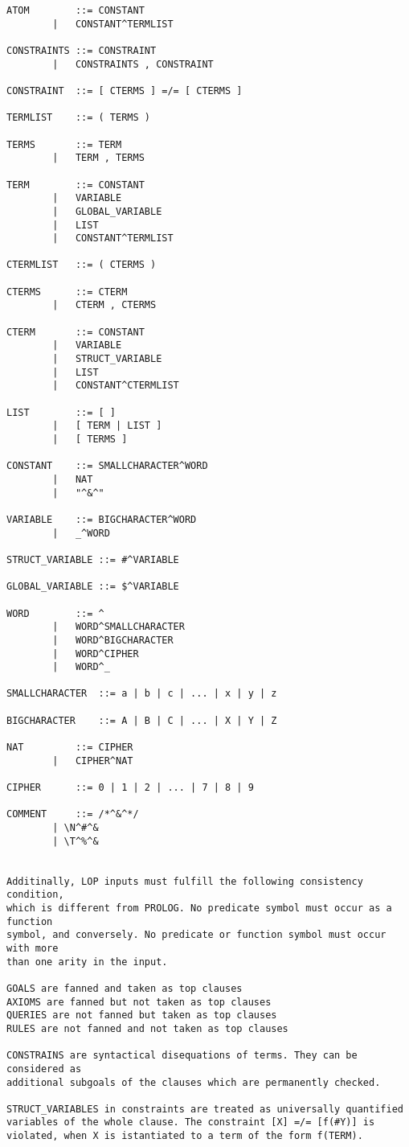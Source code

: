 \begin{verbatim}
ATOM 		::= CONSTANT 
		|   CONSTANT^TERMLIST

CONSTRAINTS	::= CONSTRAINT
		|   CONSTRAINTS , CONSTRAINT

CONSTRAINT	::= [ CTERMS ] =/= [ CTERMS ]

TERMLIST	::= ( TERMS )

TERMS	 	::= TERM
		|   TERM , TERMS

TERM		::= CONSTANT
		|   VARIABLE
		|   GLOBAL_VARIABLE
		|   LIST
		|   CONSTANT^TERMLIST

CTERMLIST	::= ( CTERMS )

CTERMS	 	::= CTERM
		|   CTERM , CTERMS

CTERM		::= CONSTANT
		|   VARIABLE
		|   STRUCT_VARIABLE
		|   LIST
		|   CONSTANT^CTERMLIST

LIST		::= [ ]
		|   [ TERM | LIST ]
		|   [ TERMS ]

CONSTANT	::= SMALLCHARACTER^WORD
		|   NAT
		|   "^&^"

VARIABLE	::= BIGCHARACTER^WORD
		|   _^WORD

STRUCT_VARIABLE	::= #^VARIABLE

GLOBAL_VARIABLE ::= $^VARIABLE

WORD		::= ^
		|   WORD^SMALLCHARACTER
		|   WORD^BIGCHARACTER
		|   WORD^CIPHER
		|   WORD^_

SMALLCHARACTER	::= a | b | c | ... | x | y | z

BIGCHARACTER	::= A | B | C | ... | X | Y | Z 

NAT 		::= CIPHER
		|   CIPHER^NAT

CIPHER		::= 0 | 1 | 2 | ... | 7 | 8 | 9

COMMENT		::= /*^&^*/
		| \N^#^&
		| \T^%^&


Additinally, LOP inputs must fulfill the following consistency condition, 
which is different from PROLOG. No predicate symbol must occur as a function 
symbol, and conversely. No predicate or function symbol must occur with more 
than one arity in the input.

GOALS are fanned and taken as top clauses
AXIOMS are fanned but not taken as top clauses
QUERIES are not fanned but taken as top clauses
RULES are not fanned and not taken as top clauses

CONSTRAINS are syntactical disequations of terms. They can be considered as 
additional subgoals of the clauses which are permanently checked. 

STRUCT_VARIABLES in constraints are treated as universally quantified 
variables of the whole clause. The constraint [X] =/= [f(#Y)] is
violated, when X is istantiated to a term of the form f(TERM).
	            

\end{verbatim}


